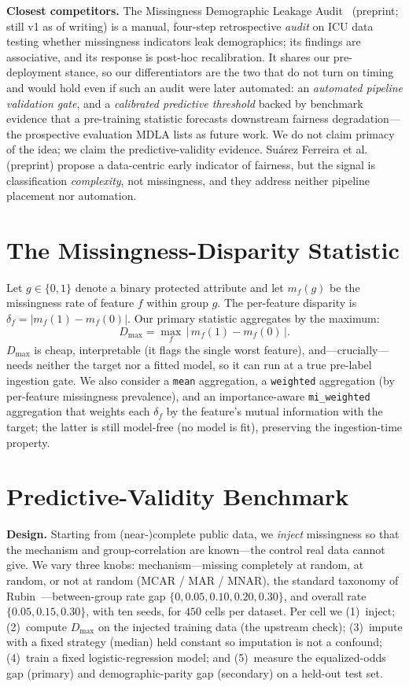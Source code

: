\documentclass[sigconf,nonacm]{acmart}
\begin{document}
\textbf{Closest competitors.}
The Missingness Demographic Leakage Audit~\cite{mdla2026} (preprint; still v1 as of writing) is a
manual, four-step retrospective \emph{audit} on ICU data testing whether missingness indicators
leak demographics; its findings are associative, and its response is post-hoc recalibration. It
shares our pre-deployment stance, so our differentiators are the two that do not turn on timing and
would hold even if such an audit were later automated: an \emph{automated pipeline validation gate},
and a \emph{calibrated predictive threshold} backed by benchmark evidence that a pre-training
statistic forecasts downstream fairness degradation---the prospective evaluation MDLA lists as
future work. We do not claim primacy of the idea; we claim the predictive-validity evidence.
Su\'arez Ferreira et al.~\cite{suarezferreira2025} (preprint) propose a data-centric early
indicator of fairness, but the signal is classification \emph{complexity}, not missingness,
and they address neither pipeline placement nor automation.

\section{The Missingness-Disparity Statistic}\label{sec:stat}
Let $g\in\{0,1\}$ denote a binary protected attribute and let $m_f(g)$ be the missingness
rate of feature $f$ within group $g$. The per-feature disparity is
$\delta_f = |m_f(1)-m_f(0)|$. Our primary statistic aggregates by the maximum:
\[
D_{\max} = \max_f\,\big|\,m_f(1)-m_f(0)\,\big|.
\]
$D_{\max}$ is cheap, interpretable (it flags the single worst feature), and---crucially---
needs neither the target nor a fitted model, so it can run at a true pre-label ingestion gate.
We also consider a \texttt{mean} aggregation, a \texttt{weighted} aggregation (by per-feature
missingness prevalence), and an importance-aware \texttt{mi\_weighted} aggregation that weights
each $\delta_f$ by the feature's mutual information with the target; the latter is still
model-free (no model is fit), preserving the ingestion-time property.

\section{Predictive-Validity Benchmark}\label{sec:method}
\textbf{Design.} Starting from (near-)complete public data, we \emph{inject} missingness so
that the mechanism and group-correlation are known---the control real data cannot give. We
vary three knobs: mechanism---missing completely at random, at random, or not at random
(MCAR / MAR / MNAR), the standard taxonomy of Rubin~\cite{rubin1976,littlerubin}---between-group
rate gap $\{0,0.05,0.10,0.20,0.30\}$, and overall rate $\{0.05,0.15,0.30\}$, with ten seeds, for
$450$ cells per dataset. Per cell we (1)~inject; (2)~compute $D_{\max}$ on the injected training data
(the upstream check); (3)~impute with a fixed strategy (median) held constant so imputation is
not a confound; (4)~train a fixed logistic-regression model; and (5)~measure the
equalized-odds gap (primary) and demographic-parity gap (secondary) on a held-out test set.
\end{document}

